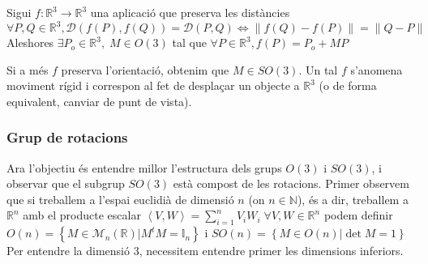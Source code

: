 \documentclass[../main.tex]{subfiles}
\begin{document}
\begin{teorema}
    Sigui $f: \mathbb{R}^3 \to \mathbb{R}^3$ una aplicació que preserva les distàncies $\forall P, Q \in \mathbb{R}^3, \mathcal{D}\left(f(P), f(Q)\right) = \mathcal{D}(P, Q) \Leftrightarrow \left\lVert f(Q)-f(P)\right\rVert = \left\lVert Q-P\right\rVert$
    Aleshores $\exists P_o \in \mathbb{R}^3,\; M \in O(3)$ tal que $\forall P \in \mathbb{R}^3, f(P) = P_o + MP$
\end{teorema}
\begin{definicio}
    Si a més $f$ preserva l'orientació, obtenim que $M \in SO(3)$.
    Un tal $f$ s'anomena moviment rígid i correspon al fet de desplaçar un objecte a $\mathbb{R}^3$
    (o de forma equivalent, canviar de punt de vista).
\end{definicio}
\subsubsection{Grup de rotacions}
Ara l'objectiu és entendre millor l'estructura dels grups $O(3)$ i $SO(3)$, i observar que el
subgrup $SO(3)$ està compost de les rotacions.
Primer observem que si treballem a l'espai euclidià de dimensió $n$ (on $n \in \mathbb{N}$), és a
dir, treballem a $\mathbb{R}^n$ amb el producte escalar $\left\langle V, W\right\rangle = \sum\limits_{i = 1}^{n} V_i W_i\; \forall V, W \in \mathbb{R}^n$
podem definir $O(n) = \left\{M \in \mathcal{M}_n(\mathbb{R}) | M^tM = \mathbb{I}_n\right\}$ i $SO(n) = \left\{M \in O(n) | \det{M} = 1\right\}$\\
Per entendre la dimensió $3$, necessitem entendre primer les dimensions inferiors.
\end{document}
